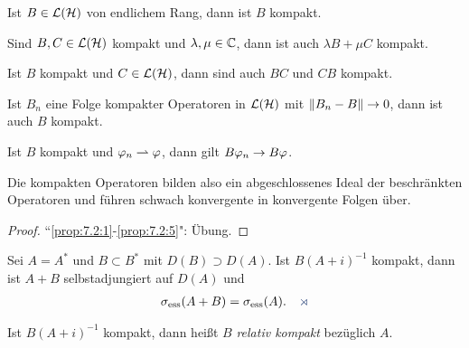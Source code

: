 \begin{prop}
\label{prop:7.2}
\begin{propenum}
\item\label{prop:7.2:1} Ist $B\in\mathcal{L}(\mathcal{H})$ von endlichem Rang, dann ist $B$
kompakt.
\item\label{prop:7.2:2} Sind $B, C\in\mathcal{L}(\mathcal{H})$ kompakt und $\lambda,\mu\in\mathbb{C}$,
dann ist auch $\lambda B+ \mu C$ kompakt.
\item\label{prop:7.2:3} Ist $B$ kompakt und $C\in\mathcal{L}(\mathcal{H})$, dann sind auch
$BC$ und $CB$ kompakt.
\item\label{prop:7.2:4} Ist $B_n$ eine Folge kompakter Operatoren in $\mathcal{L}(\mathcal{H})$
mit $\left\|B_n-B\right\|\to 0$, dann ist auch $B$ kompakt.
\item\label{prop:7.2:5} Ist $B$ kompakt und $\varphi_n\rightharpoonup \varphi$, dann gilt
$B\varphi_n\to B\varphi$.\fishhere
\end{propenum}
\end{prop}

Die kompakten Operatoren bilden also ein abgeschlossenes Ideal der beschränkten
Operatoren und führen schwach konvergente in konvergente Folgen über.

\begin{proof}
``\ref{prop:7.2:1}-\ref{prop:7.2:5}": Übung.\qedhere
\end{proof}

\begin{thm}
\label{prop:7.3}
Sei $A=A^*$ und $B\subset B^*$ mit $D(B)\supset D(A)$. Ist $B(A+i)^{-1}$
kompakt, dann ist $A+B$ selbstadjungiert auf $D(A)$ und
\begin{align*}
\sigma_\mathrm{ess}(A+B) = \sigma_\mathrm{ess}(A).\fishhere
\end{align*}
\end{thm}

Ist $B(A+i)^{-1}$ kompakt, dann heißt $B$ \emph{relativ kompakt} bezüglich $A$.

